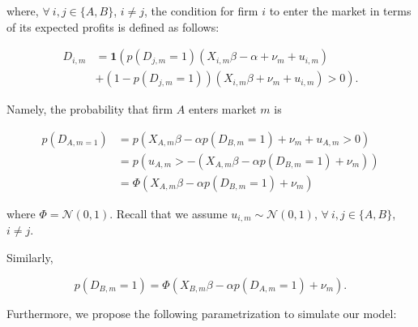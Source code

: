\documentclass[cm,linguex]{glossa}
\newcommand{\dnorm}{\mathcal{N}}
\begin{document}
where, \(\forall\ i, j \in \{A, B\}\), \(i \neq j\), the condition for
firm \(i\) to enter the market in terms of its expected profits is
defined as follows:

\begin{align*}
    D_{i, m} & = \mathbf{1} \left( p(D_{j, m} = 1) \left( X_{i, m} \beta - \alpha + \nu_m + u_{i, m} \right) \right. \\ &+ \left. \left( 1 - p(D_{j, m} = 1) \right) \left( X_{i, m} \beta + \nu_m + u_{i, m} \right) > 0 \right) .
\end{align*}

Namely, the probability that firm \(A\) enters market \(m\) is

\begin{align*}
    p \left(D_{A, m = 1}\right) & = p \left( X_{A, m} \beta - \alpha p \left( D_{B, m} = 1 \right) + \nu_m + u_{A, m} > 0 \right)              \\
                                    & = p \left( u_{A, m} > - \left( X_{A, m} \beta - \alpha p \left( D_{B, m} = 1 \right) + \nu_m \right) \right) \\
                                    & = \Phi \left( X_{A, m} \beta - \alpha p \left( D_{B, m} = 1 \right) + \nu_m \right)                              
\end{align*}

where \(\Phi = \dnorm (0, 1)\). Recall that we assume
\(u_{i, m} \sim \dnorm(0, 1)\), \(\forall\ i, j \in \{A, B\}\),
\(i \neq j\).

Similarly,

\[
p \left( D_{B, m} = 1 \right) = \Phi \left( X_{B, m} \beta - \alpha p \left( D_{A, m} = 1 \right) + \nu_m \right) .
\]

Furthermore, we propose the following parametrization to simulate our
model:
\end{document}
